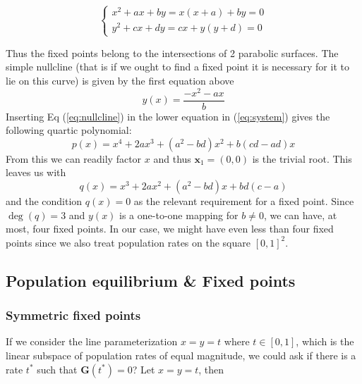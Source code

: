 \begin{equation}
	\begin{cases}
		x^2 + ax + by = x(x+a) + by = 0\\
		y^2 + cx + dy = cx + y(y+d) = 0
	\end{cases}
	\label{eq:system}
\end{equation}

Thus the fixed points belong to the intersections of 2 parabolic surfaces. The simple nullcline (that is if we ought to find a fixed point it 
is necessary for it to lie on this curve) is given by the first equation above
\begin{equation}
	y(x) = \frac{-x^2-ax}{b}
	\label{eq:nullcline}
\end{equation}
Inserting Eq (\ref{eq:nullcline}) in the lower equation in (\ref{eq:system}) gives the following quartic polynomial:
\begin{equation}
	p(x) = x^4 + 2a x^3 + (a^2 - bd)x^2 + b(cd - ad)x
\end{equation}
From this we can readily factor $x$ and thus $\symbf{x}_1 = (0, 0)$ is the trivial root. This leaves us with
\begin{equation}
	q(x) = x^3 + 2a x^2 + (a^2 - bd)x + bd(c - a)
\end{equation}
and the condition $q(x)=0$ as the relevant requirement for a fixed point.
Since $\deg(q) = 3$ and $y(x)$ is a one-to-one mapping for $b\neq 0$, we can have, at most, four fixed points. In our case, we might have even less
than four fixed points since we also treat population rates on the square $[0,1]^2$.

\subsection{Population equilibrium \& Fixed points}

\subsubsection{Symmetric fixed points}

If we consider the line parameterization $x = y = t$ where $t\in [0,1]$, which is the linear subspace of population rates of equal
magnitude, we could ask if there is a rate $t^*$ such that $\symbf{G}(t^*) = 0$? Let $x = y = t$, then

